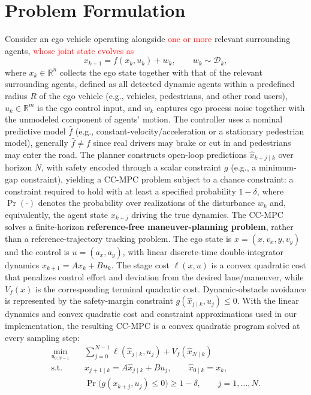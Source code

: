 \documentclass[letterpaper, 10 pt, conference]{ieeeconf}
\begin{document}
\section{Problem Formulation}
\label{sec:formulation}

Consider an ego vehicle operating alongside \textcolor{red}{one or more} relevant surrounding agents, \textcolor{red}{whose joint state evolves as}
\begin{equation}
x_{k+1} = f(x_k,u_k) + w_k, \qquad w_k \sim \mathcal D_k,
\end{equation}
where $x_k \in \mathbb{R}^{n}$ collects the ego state together with that of the relevant surrounding agents, defined as all detected dynamic agents within a predefined radius $R$ of the ego vehicle (e.g., vehicles, pedestrians, and other road users), $u_k \in \mathbb{R}^m$ is the ego control input, and $w_k$ captures ego process noise together with the unmodeled component of agents' motion. The controller uses a nominal predictive model $\hat{f}$ (e.g., constant-velocity/acceleration or a stationary pedestrian model), generally $\hat{f}\neq f$ since real drivers may brake or cut in and pedestrians may enter the road. The planner constructs open-loop predictions $\hat{x}_{k+j\mid k}$ over horizon $N$, with safety encoded through a scalar constraint $g$ (e.g., a minimum-gap constraint), yielding a CC-MPC problem subject to a chance constraint: a constraint required to hold with at least a specified probability $1-\delta$, where $\Pr(\cdot)$ denotes the probability over realizations of the disturbance $w_k$ and, equivalently, the agent state $x_{k+j}$ driving the true dynamics. The CC-MPC solves a finite-horizon \textbf{reference-free maneuver-planning problem}, rather than a reference-trajectory tracking problem. The ego state is $x=(x,v_x,y,v_y)$ and the control is $u=(a_x,a_y)$, with linear discrete-time double-integrator dynamics $x_{k+1}=Ax_k+Bu_k$. The stage cost $\ell(x,u)$ is a convex quadratic cost that penalizes control effort and deviation from the desired lane/maneuver, while $V_f(x)$ is the corresponding terminal quadratic cost. Dynamic-obstacle avoidance is represented by the safety-margin constraint $g(\hat{x}_{j\mid k},u_j)\leq0$. With the linear dynamics and convex quadratic cost and constraint approximations used in our implementation, the resulting CC-MPC is a convex quadratic program solved at every sampling step:
\begin{align}
\min_{u_{0:N-1}} \quad & \sum_{j=0}^{N-1}\ell(\hat{x}_{j\mid k},u_j) + V_f(\hat{x}_{N\mid k}) \nonumber \\
\text{s.t.}\quad & \hat{x}_{j+1\mid k}=A\hat{x}_{j\mid k}+Bu_j,\qquad \hat{x}_{0\mid k}=x_k, \nonumber \\
& \Pr\big(g(x_{k+j},u_j)\leq0\big)\geq1-\delta,\qquad j=1,\ldots,N .
\label{eq:cc-classical}
\end{align}
\end{document}

